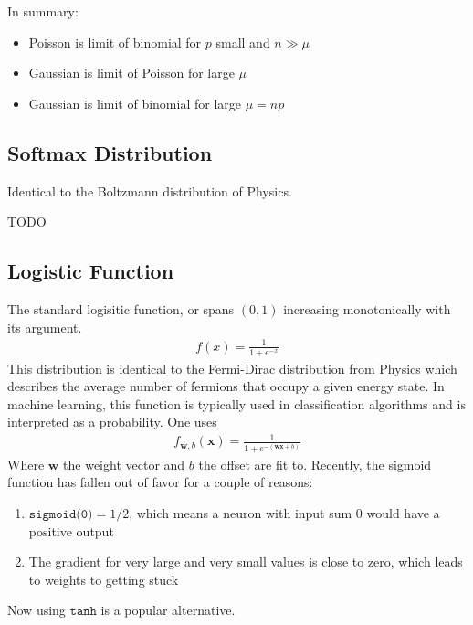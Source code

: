In summary:
\begin{itemize}
	\item Poisson is limit of binomial for $p$ small and $n\gg \mu$
	\item Gaussian is limit of Poisson for large $\mu$
	\item Gaussian is limit of binomial for large $\mu=np$
\end{itemize}

\subsection{Softmax Distribution}
Identical to the Boltzmann distribution of Physics.

TODO

\subsection{Logistic Function}\label{logistic_function}
The standard logisitic function, or  spans $(0,1)$ increasing monotonically with its argument.
\begin{align}
	f(x) = \frac{1}{1+e^{-x}}
\end{align}
This distribution is identical to the Fermi-Dirac distribution from Physics which describes the average number of fermions that occupy a given energy state. In machine learning, this function is typically used in classification algorithms and is interpreted as a probability. One uses
\begin{align}
	f_{\mathbf{w},b}(\mathbf{x}) = \frac{1}{1+e^{-(\mathbf{wx} +b)}}
\end{align}
Where $\mathbf{w}$ the weight vector and $b$ the offset are fit to. Recently, the sigmoid function has fallen out of favor for a couple of reasons\cite{grus}:
\begin{enumerate}
	\item $\texttt{sigmoid(0)} = 1/2$, which means a neuron with input sum 0 would have a positive output
	\item The gradient for very large and very small values is close to zero, which leads to weights to getting stuck
\end{enumerate}
Now using $\texttt{tanh}$ is a popular alternative.

